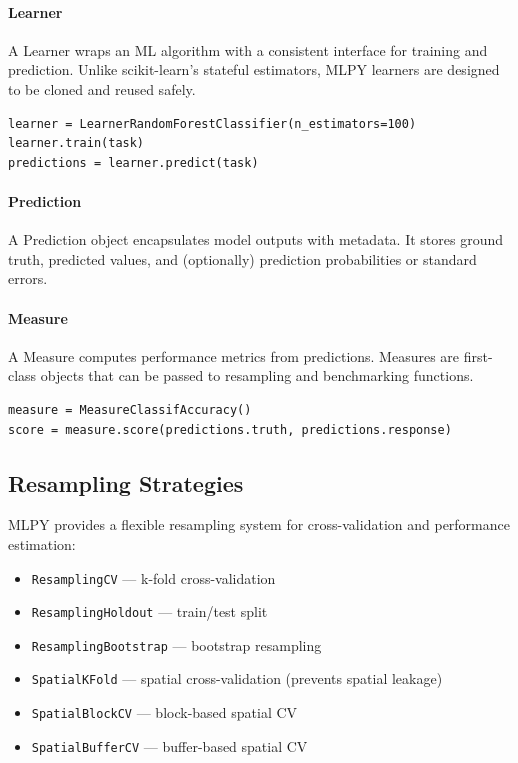 \documentclass[twoside,11pt]{article}
\begin{document}
\paragraph{Learner}
A Learner wraps an ML algorithm with a consistent interface for training and
prediction. Unlike scikit-learn's stateful estimators, MLPY learners are
designed to be cloned and reused safely.

\begin{lstlisting}
learner = LearnerRandomForestClassifier(n_estimators=100)
learner.train(task)
predictions = learner.predict(task)
\end{lstlisting}

\paragraph{Prediction}
A Prediction object encapsulates model outputs with metadata. It stores ground
truth, predicted values, and (optionally) prediction probabilities or standard
errors.

\paragraph{Measure}
A Measure computes performance metrics from predictions. Measures are first-class
objects that can be passed to resampling and benchmarking functions.

\begin{lstlisting}
measure = MeasureClassifAccuracy()
score = measure.score(predictions.truth, predictions.response)
\end{lstlisting}

\subsection{Resampling Strategies}

MLPY provides a flexible resampling system for cross-validation and performance
estimation:

\begin{itemize}
  \item \texttt{ResamplingCV} --- k-fold cross-validation
  \item \texttt{ResamplingHoldout} --- train/test split
  \item \texttt{ResamplingBootstrap} --- bootstrap resampling
  \item \texttt{SpatialKFold} --- spatial cross-validation (prevents spatial leakage)
  \item \texttt{SpatialBlockCV} --- block-based spatial CV
  \item \texttt{SpatialBufferCV} --- buffer-based spatial CV
\end{itemize}
\end{document}

